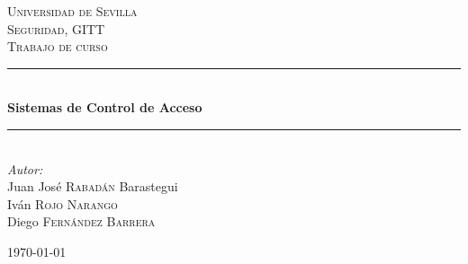 \documentclass{article} %
\begin{document}

\begin{titlepage}

\newcommand{\HRule}{\rule{\linewidth}{0.5mm}} %

\center %

\textsc{\LARGE Universidad de Sevilla}\\[1.5cm] %
\textsc{\Large Seguridad, GITT}\\[0.5cm] %
\textsc{\large Trabajo de curso}\\[0.5cm] %

\HRule \\[0.4cm]
{ \huge \bfseries Sistemas de Control de Acceso}\\[0.4cm] %
\HRule \\[1.5cm]

\large
\emph{Autor:}\\

Juan José \textsc{Rabadán} Barastegui \\
Iván \textsc{Rojo Narango} \\
Diego \textsc{Fernández Barrera} 

\hspace{3cm}

{\large \today}\\ %

\vfill %

\end{titlepage}
\tableofcontents
\newpage


\newpage

\newpage

\newpage

\end{document}
